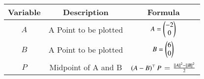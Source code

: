 \begin{center}
    \begin{tabular}{|c|c|c|} 
        \hline
            \textbf{Variable} & \textbf{Description} & \textbf{Formula} \\ 
        \hline
            $A$   & A Point to be plotted & $A = \begin{pmatrix}-2 \\ 0\end{pmatrix}$ \\ 
        \hline
            $B$   &  A Point to be plotted &  $B = \begin{pmatrix}6 \\ 0\end{pmatrix}$\\ 
        \hline
            $P$   & Midpoint of  A and B & $\left(A-B\right)^\top P$ = $\frac{\left\vert\left\vert A\right\vert\right\vert^2-\left\vert\left\vert B\right\vert\right\vert^2}{2}$\\
        \hline
    \end{tabular}
\end{center}  
